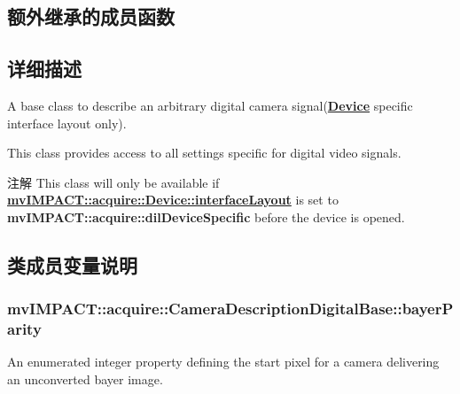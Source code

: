 \subsection*{额外继承的成员函数}


\subsection{详细描述}
A base class to describe an arbitrary digital camera signal({\bfseries \hyperlink{classmv_i_m_p_a_c_t_1_1acquire_1_1_device}{Device}} specific interface layout only). 

This class provides access to all settings specific for digital video signals.

\begin{DoxyNote}{注解}
This class will only be available if {\bfseries \hyperlink{classmv_i_m_p_a_c_t_1_1acquire_1_1_device_ab4dd0ecc9d456bb5ddc01d844c9d6f2d}{mv\+I\+M\+P\+A\+C\+T\+::acquire\+::\+Device\+::interface\+Layout}} is set to {\bfseries mv\+I\+M\+P\+A\+C\+T\+::acquire\+::dil\+Device\+Specific} before the device is opened. 
\end{DoxyNote}


\subsection{类成员变量说明}
\hypertarget{classmv_i_m_p_a_c_t_1_1acquire_1_1_camera_description_digital_base_a3559cea18f8846eb4618a762aa615b25}{
\subsubsection[{bayer\+Parity}]{ mv\+I\+M\+P\+A\+C\+T\+::acquire\+::\+Camera\+Description\+Digital\+Base\+::bayer\+Parity}}\label{classmv_i_m_p_a_c_t_1_1acquire_1_1_camera_description_digital_base_a3559cea18f8846eb4618a762aa615b25}


An enumerated integer property defining the start pixel for a camera delivering an unconverted bayer image. 

